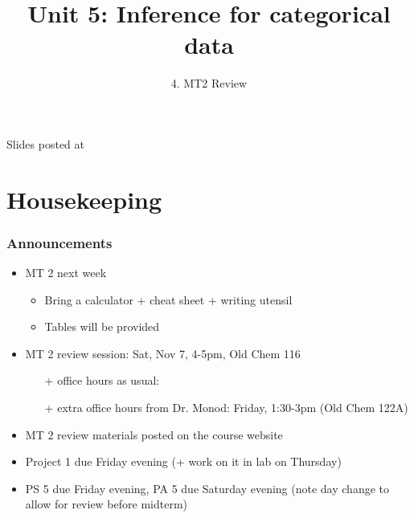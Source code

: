 \documentclass[slidestop,compress,mathserif,12pt,t,professionalfonts,xcolor=table]{beamer}
\title{Unit 5: Inference for categorical data}
\subtitle{4. MT2 Review}
\author{\CourseName}
\date{}
\institute{\InstituteName}
\begin{document}



\begin{frame}[plain]

\titlepage

\vfill

{\scriptsize {} \hfill Slides posted at  \webURL{\CourseSite}}

\addtocounter{framenumber}{-1} 

\end{frame}


\section{Housekeeping}


\begin{frame}
\frametitle{Announcements}

\begin{itemize}

\item MT 2 next week
\begin{itemize}
\item Bring a calculator + cheat sheet + writing utensil
\item Tables will be provided
\end{itemize}

\item MT 2 review session: Sat, Nov 7, 4-5pm, Old Chem 116
\begin{itemize}
\item[+] office hours as usual: 
\item[+] extra office hours from Dr. Monod: Friday, 1:30-3pm (Old Chem 122A)
\end{itemize}

\item MT 2 review materials posted on the course website

\item Project 1 due Friday evening (+ work on it in lab on Thursday)

\item PS 5 due Friday evening, PA 5 due Saturday evening (note day change to allow for review before midterm)

\end{itemize}

\end{frame}
\end{document}
